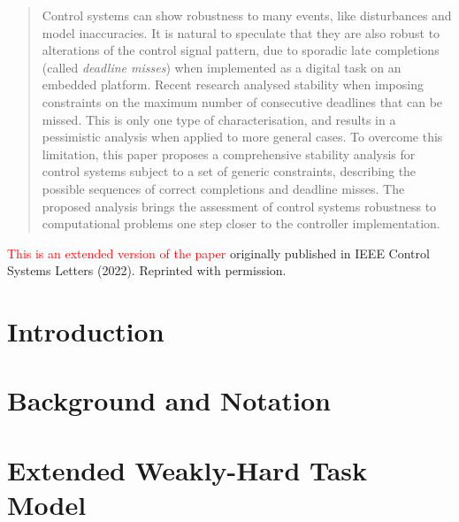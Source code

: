 \renewcommand\thisdir{papers/lcss22}
\renewcommand\figdir{\thisdir/figs}




\begin{abstract}
    Control systems can show robustness to many events, like disturbances and model inaccuracies.
    It is natural to speculate that they are also robust to alterations of the control signal pattern, due to sporadic late completions (called \emph{deadline misses}) when implemented as a digital task on an embedded platform.
    Recent research analysed stability when imposing constraints on the maximum number of consecutive deadlines that can be missed.
    This is only one type of characterisation, and results in a pessimistic analysis when applied to more general cases.
    To overcome this limitation, this paper proposes a comprehensive stability analysis for control systems subject to a set of generic constraints, describing the possible sequences  of correct completions and deadline misses.
    The proposed analysis brings the assessment of control systems robustness to computational problems one step closer to the controller implementation.
\end{abstract}

\vfill
\textcolor{red}{This is an extended version of the paper} originally published in IEEE Control Systems Letters (2022). 
Reprinted with permission.
\newpage

\section{Introduction}
\label{sec:intro}


\section{Background and Notation}
\label{sec:background}


\section{Extended Weakly-Hard Task Model}
\label{sec:model}


